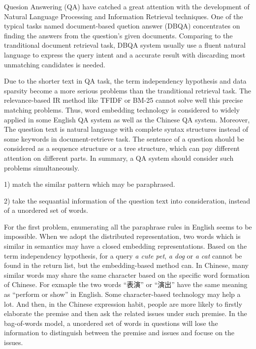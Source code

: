\documentclass{llncs}
\begin{document}
Quesion Answering (QA) have catched a great attention with the development of Natural Language Processing and Information Retrieval techniques. One of the typical tasks named document-based quetion answer (DBQA) concentrates on finding the answers from the question's given documents.
Comparing to the tranditional document retrieval task, DBQA system usually use a fluent natural language to express the query intent and a accurate result with discarding most unmatching candidates is needed. 

Due to the shorter text in QA task, the term independency hypothesis and data sparsity become a more serious problems than the tranditional retrieval task. The relevance-based IR method like TFIDF or BM-25 cannot solve well this precise matching problems. Thus, word embedding technology \cite{Mikolov2013Efficient} is considered to widely applied in some English QA system as well as the Chinese QA system. Moreover, The question text is natural language with complete syntax structures instead of some keywords in document-retrieve task. The sentence of a question should be considered as a sequence structure or a tree structure, which can pay different attention on different parts. In summary, a QA system should consider such problems simultaneously.

1) match the similar pattern which may be paraphrased.  

2) take the sequantial information of the question text into consideration, instead of a unordered set of words.

For the first problem, enumerating all the paraphrase rules in English seems to be impossible. When we adopt the distributed representation, two words which is similar in semantics may have a closed embedding representations.  Based on the term independency hypothesis, for a query \emph{a cute pet}, \emph{a dog} or \emph{a cat} cannot be found in the return list, but the embedding-based method can. In Chinese, many similar words may share the same character based on the specific word formation of Chinese. For exmaple the two words ``表演'' or ``演出'' have the same meaning as ``perform or show'' in English. Some character-based technology may help a lot.  
And then, in the Chinese expression habit, people are more likely to firstly elaborate the premise  and then ask the related issues under such premise. In the bag-of-words model, a unordered set of words in questions  will lose the information to distinguish between the premise and issues and focuse on the issues.
\end{document}
